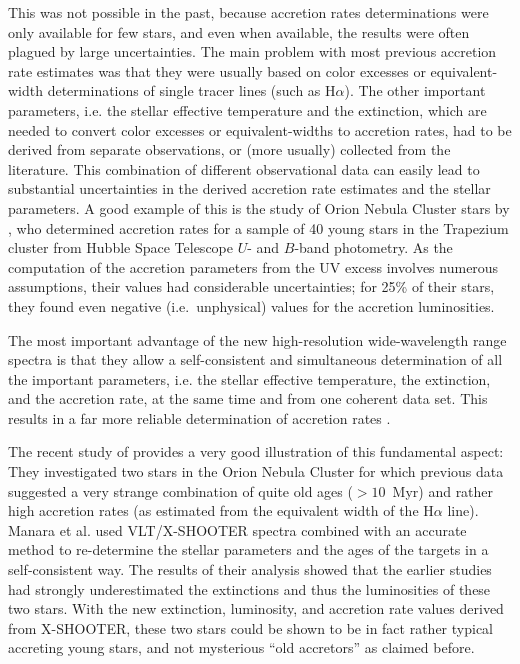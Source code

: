 \documentclass[10pt,fleqn,twoside]{article}
\begin{document}
This was not possible in the past, because accretion rates determinations were only
available for few stars, and even when available, the results were often
plagued by large uncertainties.
%
The main problem with most  previous accretion rate estimates was
 that they were usually
based on color excesses or equivalent-width determinations of single tracer lines
(such as H$\alpha$). The other important parameters, i.e. the  stellar effective
temperature and the extinction, which are needed to convert color excesses or
equivalent-widths to accretion rates, had to be derived from separate observations,
or (more usually) collected from the literature.
This combination of different observational data can easily lead to
substantial uncertainties in the derived accretion rate estimates and the stellar parameters.
%
%
A good example of this is the  study of Orion Nebula Cluster stars by \citet{Robberto04},
who determined
accretion rates for a sample of 40
young stars in the Trapezium cluster from Hubble Space Telescope $U$- and $B$-band photometry.
As the computation of the accretion parameters                          
from the UV excess 
involves numerous assumptions, their values had
considerable uncertainties; for 25\% of their
stars, they found even negative (i.e.~unphysical) values for the accretion luminosities.




The most important advantage of the new high-resolution wide-wavelength range
spectra is that they allow a self-consistent and simultaneous
determination of all the important parameters,  i.e. the
stellar effective temperature, the extinction, and the accretion rate, at the same time and
from one coherent data set.
This results in a far more reliable determination of accretion rates \citep[see][]{MT14}.



The recent study of \citet{Manara13} 
provides a very good illustration of this
fundamental aspect: They investigated two stars in the Orion Nebula Cluster
for which previous data suggested a very strange combination 
of quite old ages ($> 10$~Myr)
and rather high accretion rates (as estimated from the equivalent width
of the H$\alpha$ line).
Manara et al. used  VLT/X-SHOOTER spectra combined
 with an accurate method to re-determine the stellar parameters and the ages of the targets in a 
self-consistent way.
The results of their analysis showed that the earlier
studies had strongly underestimated the extinctions and thus the luminosities
of these two stars. With the new extinction, luminosity, and accretion rate
values derived from X-SHOOTER, these two stars could be shown to be in fact
rather typical accreting young  stars, and not mysterious ``old accretors'' as claimed
before.
\end{document}
